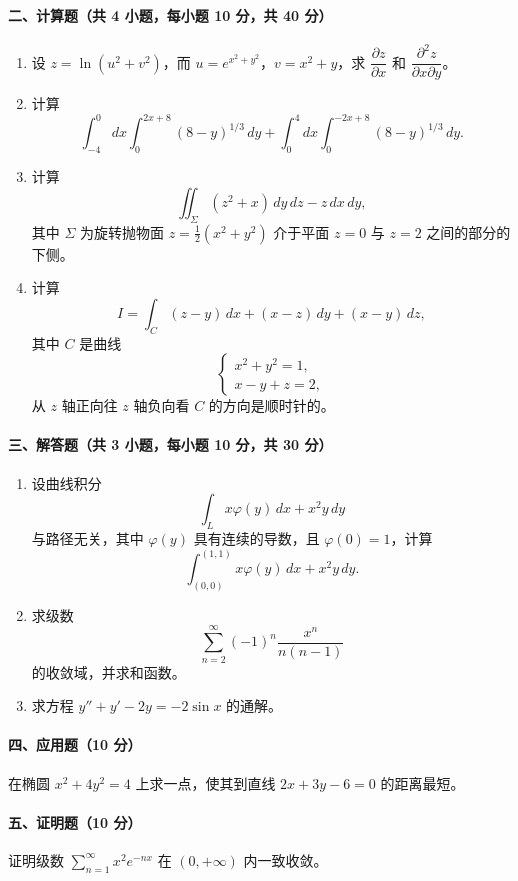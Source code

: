 \paragraph{二、计算题（共 4 小题，每小题 10 分，共 40 分）}
\begin{enumerate}
  \item 设 $z=\ln(u^2+v^2)$，而 $u=e^{x^2+y^2}$，$v=x^2+y$，求 $\dfrac{\partial z}{\partial x}$ 和 $\dfrac{\partial^2z}{\partial x\partial y}$。
  \item 计算
  \[
    \int_{-4}^0 dx\int_0^{2x+8}(8-y)^{1/3}\,dy
    +\int_0^4 dx\int_0^{-2x+8}(8-y)^{1/3}\,dy .
  \]
  \item 计算
  \[
    \iint_\Sigma (z^2+x)\,dy\,dz-z\,dx\,dy,
  \]
  其中 $\Sigma$ 为旋转抛物面 $z=\frac12(x^2+y^2)$ 介于平面 $z=0$ 与 $z=2$ 之间的部分的下侧。
  \item 计算
  \[
    I=\int_C (z-y)\,dx+(x-z)\,dy+(x-y)\,dz,
  \]
  其中 $C$ 是曲线
  \[
    \begin{cases}
      x^2+y^2=1,\\
      x-y+z=2,
    \end{cases}
  \]
  从 $z$ 轴正向往 $z$ 轴负向看 $C$ 的方向是顺时针的。
\end{enumerate}

\paragraph{三、解答题（共 3 小题，每小题 10 分，共 30 分）}
\begin{enumerate}
  \item 设曲线积分
  \[
    \int_L x\varphi(y)\,dx+x^2y\,dy
  \]
  与路径无关，其中 $\varphi(y)$ 具有连续的导数，且 $\varphi(0)=1$，计算
  \[
    \int_{(0,0)}^{(1,1)}x\varphi(y)\,dx+x^2y\,dy.
  \]
  \item 求级数
  \[
    \sum_{n=2}^\infty (-1)^n\frac{x^n}{n(n-1)}
  \]
  的收敛域，并求和函数。
  \item 求方程 $y''+y'-2y=-2\sin x$ 的通解。
\end{enumerate}

\paragraph{四、应用题（10 分）}
在椭圆 $x^2+4y^2=4$ 上求一点，使其到直线 $2x+3y-6=0$ 的距离最短。

\paragraph{五、证明题（10 分）}
证明级数 $\displaystyle \sum_{n=1}^\infty x^2e^{-nx}$ 在 $(0,+\infty)$ 内一致收敛。

